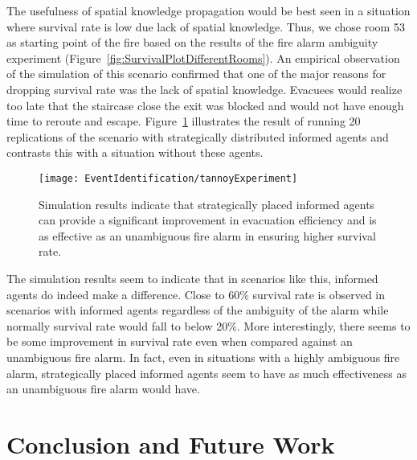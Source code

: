 The usefulness of spatial knowledge propagation would be best seen in a situation where survival rate is low due lack of spatial knowledge. Thus, we chose room 53 as starting point of the fire based on the results of the fire alarm ambiguity experiment (Figure~\ref{fig:SurvivalPlotDifferentRooms}). An empirical observation of the simulation of this scenario  confirmed that one of the major reasons for dropping survival rate was the lack of spatial knowledge. Evacuees would realize too late that the staircase close the exit was blocked and would not have enough time to reroute and escape. Figure~\ref{fig:tannoyExperiment} illustrates the result of running 20 replications of the scenario with strategically distributed informed agents and contrasts this with a situation without these agents.

\begin{figure}[!t]
    \centering
    \texttt{[image: EventIdentification/tannoyExperiment]}
    \caption[Experiment 4: The importance of spatial knowledge propagation]{Simulation results indicate that strategically placed informed agents can provide a significant improvement in evacuation efficiency and is as effective as an unambiguous fire alarm in ensuring higher survival rate.}
    \label{fig:tannoyExperiment}
\end{figure}

The simulation results seem to indicate that in scenarios like this, informed agents do indeed make a difference. Close to 60\% survival rate is observed in scenarios with informed agents regardless of the ambiguity of the alarm while normally survival rate would fall to below 20\%. More interestingly, there seems to be some improvement in survival rate even when compared against an unambiguous fire alarm. In fact, even in situations with a highly ambiguous fire alarm, strategically placed informed agents seem to have as much effectiveness as an unambiguous fire alarm would have.

\section{Conclusion and Future Work}
\label{PreEvac:ConclusionAndFutureWork}

